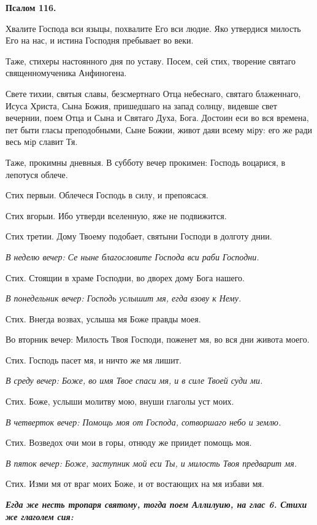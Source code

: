 \medskip


\bfseries Псалом 116.\normalfont{}\nopagebreak


Хвалите Господа вси языцы, похвалите Его вси людие. Яко утвердися милость Его на нас, и истина Господня пребывает во веки.

Таже, стихеры настоянного дня по уставу. Посем, сей стих, творение святаго священномученика Анфиногена.

Свете тихии, святыя славы, безсмертнаго Отца небеснаго, святаго блаженнаго, Исуса Христа, Сына Божия, пришедшаго на запад солнцу, видевше свет вечернии, поем Отца и Сына и Святаго Духа, Бога. Достоин еси во вся времена, пет быти гласы преподобными, Сыне Божии, живот даяи всему мiру: его же ради весь мiр славит Тя.

Таже, прокимны дневныя. В субботу вечер прокимен: Господь воцарися, в лепотуся облече. 

Стих первыи. Облечеся Господь в силу, и препоясася.

Стих вгорыи. Ибо утверди вселенную, яже не подвижится.

Стих третии. Дому Твоему подобает, святыни Господи в долготу днии.


\itshape В неделю вечер:\normalfont{} Се ныне благословите Господа вси раби Господни.

Стих. Стоящии в храме Господни, во дворех дому Бога нашего.


\itshape В понедельник вечер:\normalfont{} Господь услышит мя, егда взову к Нему.

Стих. Внегда возвах, услыша мя Боже правды моея.


Во вторник вечер: Милость Твоя Господи, поженет мя, во вся дни живота моего.

Стих. Господь пасет мя, и ничто же мя лишит.


\itshape В среду вечер:\normalfont{} Боже, во имя Твое спаси мя, и в силе Твоей суди ми.

Стих. Боже, услыши молитву мою, внуши глаголы уст моих.


\itshape В четверток вечер:\normalfont{} Помощь моя от Господа, сотворшаго небо и землю.

Стих. Возведох очи мои в горы, отнюду же приидет помощь моя.


\itshape В пяток вечер:\normalfont{} Боже, заступник мой еси Ты, и милость Твоя предварит мя.

Стих. Изми мя от враг моих Боже, и от востающих на мя избави мя.


\bfseries \itshape Егда же несть тропаря святому, тогда поем Аллилуию, на глас 6. Стихи же глаголем сия:\normalfont{}\normalfont{}\nopagebreak


